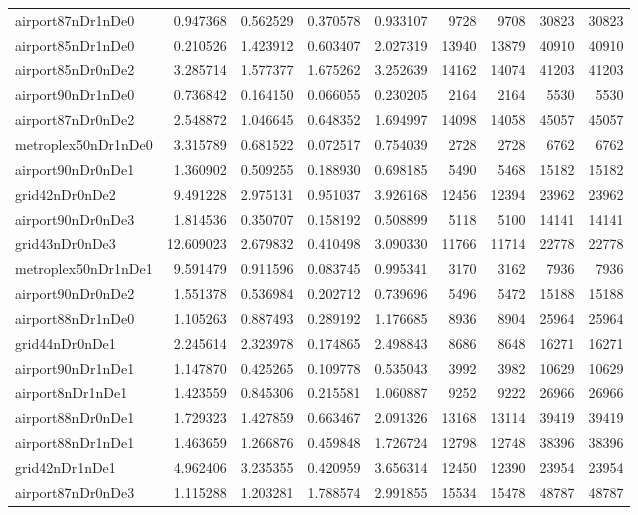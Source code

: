 \begin{longtable}{|l|r|r|r|r|r|r|r|r|}
airport87nDr1nDe0 & 0.947368 & 0.562529 & 0.370578 & 0.933107 & 9728 & 9708 & 30823 & 30823 \\
airport85nDr1nDe0 & 0.210526 & 1.423912 & 0.603407 & 2.027319 & 13940 & 13879 & 40910 & 40910 \\
airport85nDr0nDe2 & 3.285714 & 1.577377 & 1.675262 & 3.252639 & 14162 & 14074 & 41203 & 41203 \\
airport90nDr1nDe0 & 0.736842 & 0.164150 & 0.066055 & 0.230205 & 2164 & 2164 & 5530 & 5530 \\
airport87nDr0nDe2 & 2.548872 & 1.046645 & 0.648352 & 1.694997 & 14098 & 14058 & 45057 & 45057 \\
metroplex50nDr1nDe0 & 3.315789 & 0.681522 & 0.072517 & 0.754039 & 2728 & 2728 & 6762 & 6762 \\
airport90nDr0nDe1 & 1.360902 & 0.509255 & 0.188930 & 0.698185 & 5490 & 5468 & 15182 & 15182 \\
grid42nDr0nDe2 & 9.491228 & 2.975131 & 0.951037 & 3.926168 & 12456 & 12394 & 23962 & 23962 \\
airport90nDr0nDe3 & 1.814536 & 0.350707 & 0.158192 & 0.508899 & 5118 & 5100 & 14141 & 14141 \\
grid43nDr0nDe3 & 12.609023 & 2.679832 & 0.410498 & 3.090330 & 11766 & 11714 & 22778 & 22778 \\
metroplex50nDr1nDe1 & 9.591479 & 0.911596 & 0.083745 & 0.995341 & 3170 & 3162 & 7936 & 7936 \\
airport90nDr0nDe2 & 1.551378 & 0.536984 & 0.202712 & 0.739696 & 5496 & 5472 & 15188 & 15188 \\
airport88nDr1nDe0 & 1.105263 & 0.887493 & 0.289192 & 1.176685 & 8936 & 8904 & 25964 & 25964 \\
grid44nDr0nDe1 & 2.245614 & 2.323978 & 0.174865 & 2.498843 & 8686 & 8648 & 16271 & 16271 \\
airport90nDr1nDe1 & 1.147870 & 0.425265 & 0.109778 & 0.535043 & 3992 & 3982 & 10629 & 10629 \\
airport8nDr1nDe1 & 1.423559 & 0.845306 & 0.215581 & 1.060887 & 9252 & 9222 & 26966 & 26966 \\
airport88nDr0nDe1 & 1.729323 & 1.427859 & 0.663467 & 2.091326 & 13168 & 13114 & 39419 & 39419 \\
airport88nDr1nDe1 & 1.463659 & 1.266876 & 0.459848 & 1.726724 & 12798 & 12748 & 38396 & 38396 \\
grid42nDr1nDe1 & 4.962406 & 3.235355 & 0.420959 & 3.656314 & 12450 & 12390 & 23954 & 23954 \\
airport87nDr0nDe3 & 1.115288 & 1.203281 & 1.788574 & 2.991855 & 15534 & 15478 & 48787 & 48787 \\

\end{longtable}
